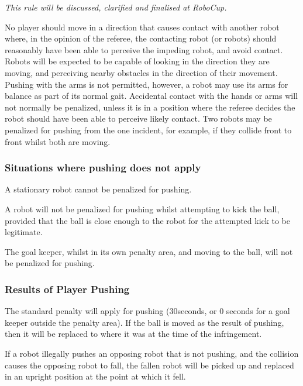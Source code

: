 \documentclass[12pt]{article}
\begin{document}
\emph{This rule will be discussed, clarified and finalised at RoboCup.}

No player should move in a direction that causes contact with another robot where, in the opinion of the referee, the contacting robot (or robots) should reasonably have been able to perceive the impeding robot, and avoid contact. Robots will be expected to be capable of looking in the direction they are moving, and perceiving nearby obstacles in the direction of their movement. Pushing with the arms is not permitted, however, a robot may use its arms for balance as part of its normal gait. Accidental contact with the hands or arms will not normally be penalized, unless it is in a position where the referee decides the robot should have been able to perceive likely contact.  Two robots may be penalized for pushing from the one incident, for example, if they collide front to front whilst both are moving.

\subsubsection{Situations where pushing does not apply}

A stationary robot cannot be penalized for pushing.

A robot will not be penalized for pushing whilst attempting to kick the ball, provided that the ball is close enough to the robot for the attempted kick to be legitimate.

The goal keeper, whilst in its own penalty area, and moving to the ball, will not be penalized for pushing.

\subsubsection{Results of Player Pushing}

The standard penalty will apply for pushing (30seconds, or 0 seconds for a goal keeper outside the penalty area). If the ball is moved as the result of pushing, then it will be replaced to where it was at the time of the infringement.

If a robot illegally pushes an opposing robot that is not pushing, and the collision causes the opposing robot to fall, the fallen robot will be picked up and replaced in an upright position at the point at which it fell.
\end{document}
